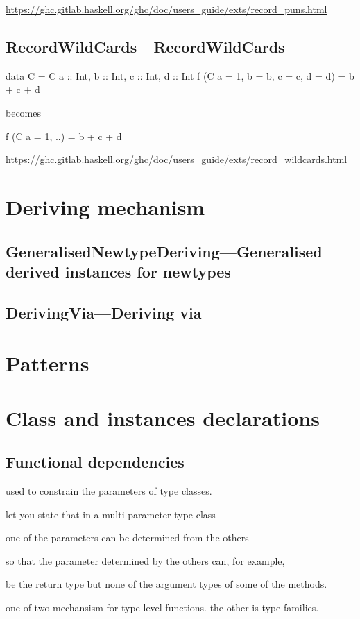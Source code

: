 \documentclass[openany, 12pt]{book}
\begin{document}
\url{https://ghc.gitlab.haskell.org/ghc/doc/users_guide/exts/record_puns.html}

\chapter{RecordWildCards---RecordWildCards}
\begin{haskell}{}
data C = C {a :: Int, b :: Int, c :: Int, d :: Int}
f (C {a = 1, b = b, c = c, d = d}) = b + c + d
\end{haskell}
becomes

\begin{haskell}{}
f (C {a = 1, ..}) = b + c + d
\end{haskell}
\url{https://ghc.gitlab.haskell.org/ghc/doc/users_guide/exts/record_wildcards.html}


\part{Deriving mechanism}
\setcounter{chapter}{4}
\chapter{GeneralisedNewtypeDeriving---Generalised derived instances for newtypes}

\setcounter{chapter}{7}
\chapter{DerivingVia---Deriving via}

\part{Patterns}
\part{Class and instances declarations}

\setcounter{chapter}{6}
\chapter{Functional dependencies}
\begin{alist}
	\item used to constrain the parameters of type classes.
	\item let you state that in a multi-parameter type class
	\item one of the parameters can be determined from the others
	\item so that the parameter determined by the others can, for example,
	\item be the return type but none of the argument types of some of the methods.
	\item one of two mechansism for type-level functions. the other is type
	families.
\end{alist}
\end{document}
